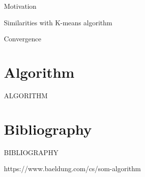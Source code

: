 \documentclass{beamer}
\begin{document}
		
	\begin{frame}{Motivation}
	
	\end{frame}
	
	
	\begin{frame}{Similarities with K-means algorithm}
	
	\end{frame}

	
	\begin{frame}{Convergence}
	
	\end{frame}



\section{Algorithm}

	\begin{frame}
	
		\begin{center}
			
			\Huge ALGORITHM
		\end{center}
	\end{frame}










\section{Bibliography}
	
	\begin{frame}
	
		\begin{center}

			\Huge BIBLIOGRAPHY
		\end{center}
	\end{frame}


	\begin{frame}
	
https://www.baeldung.com/cs/som-algorithm
	\end{frame}
\end{document}
